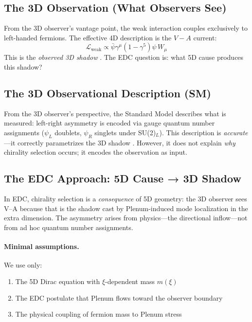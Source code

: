 \subsection{The 3D Observation (What Observers See)}

From the 3D observer's vantage point, the weak interaction couples exclusively
to left-handed fermions. The effective 4D description is the $V{-}A$ current:
\begin{equation}
    \mathcal{L}_{\text{weak}} \propto \bar\psi \gamma^\mu (1 - \gamma^5) \psi \, W_\mu
    \label{eq:ch9_va_current}
\end{equation}
This is the \emph{observed 3D shadow} \tagBL{}. The EDC question is: what 5D
cause produces this shadow?

\subsection{The 3D Observational Description (SM)}

From the 3D observer's perspective, the Standard Model describes what is
measured: left-right asymmetry is encoded via gauge quantum number assignments
($\psi_L$ doublets, $\psi_R$ singlets under SU(2)$_L$). This description is
\emph{accurate}---it correctly parametrizes the 3D shadow \tagBL{}. However,
it does not explain \emph{why} chirality selection occurs; it encodes the
observation as input.

\subsection{The EDC Approach: 5D Cause → 3D Shadow}

In EDC, chirality selection is a \emph{consequence} of 5D geometry: the 3D
observer sees V--A because that is the shadow cast by Plenum-induced mode
localization in the extra dimension. The asymmetry arises from physics---the
directional inflow---not from ad hoc quantum number assignments.

\paragraph{Minimal assumptions.}
We use only:
\begin{enumerate}[nosep]
    \item The 5D Dirac equation with $\xi$-dependent mass $m(\xi)$ \tagBL{}
    \item The EDC postulate that Plenum flows toward the observer boundary \tagP{}
    \item The physical coupling of fermion mass to Plenum stress \tagP{}
\end{enumerate}

